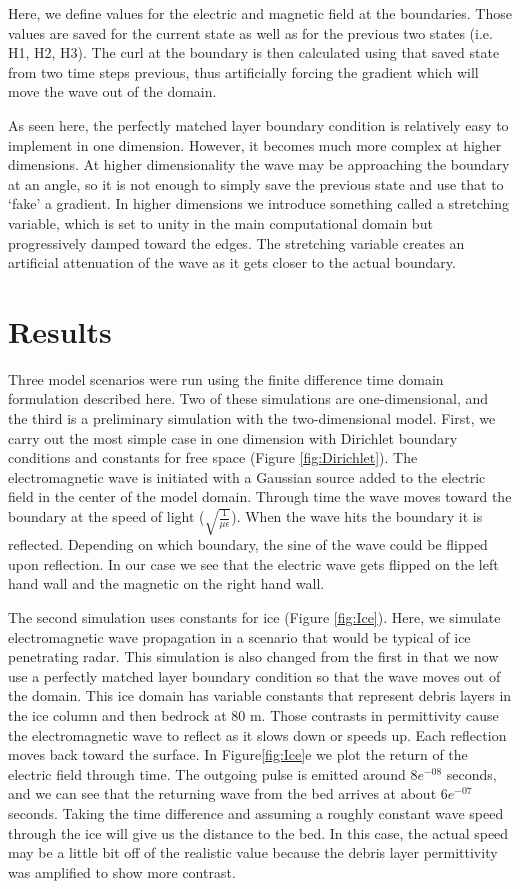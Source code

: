 \documentclass[a4paper]{article}
\begin{document}
Here, we define values for the electric and magnetic field at the boundaries. Those values are saved for the current state as well as for the previous two states (i.e. H1, H2, H3). The curl at the boundary is then calculated using that saved state from two time steps previous, thus artificially forcing the gradient which will move the wave out of the domain. 

As seen here, the perfectly matched layer boundary condition is relatively easy to implement in one dimension. However, it becomes much more complex at higher dimensions. At higher dimensionality the wave may be approaching the boundary at an angle, so it is not enough to simply save the previous state and use that to `fake' a gradient. In higher dimensions we introduce something called a stretching variable, which is set to unity in the main computational domain but progressively damped toward
the edges. The stretching variable creates an artificial attenuation of the wave as it gets closer to the actual boundary.  

\section{Results}

Three model scenarios were run using the finite difference time domain formulation described here. Two of these simulations are one-dimensional, and the third is a preliminary simulation with the two-dimensional model. First, we carry out the most simple case in one dimension with Dirichlet boundary conditions and constants for free space (Figure \ref{fig:Dirichlet}). The electromagnetic wave is initiated with a Gaussian source added to the electric field in the center of the model domain.
Through time the wave moves toward the boundary at the speed of light ($\sqrt{\frac{1}{\mu \epsilon}}$). When the wave hits the boundary it is reflected. Depending on which boundary, the sine of the wave could be flipped upon reflection. In our case we see that the electric wave gets flipped on the left hand wall and the magnetic on the right hand wall. 

The second simulation uses constants for ice (Figure \ref{fig:Ice}). Here, we simulate electromagnetic wave propagation in a scenario that would be typical of ice penetrating radar. This simulation is also changed from the first in that we now use a perfectly matched layer boundary condition so that the wave moves out of the domain. This ice domain has variable constants that represent debris layers in the ice column and then bedrock at 80 m. Those contrasts in permittivity cause the
electromagnetic wave to reflect as it slows down or speeds up. Each reflection moves back toward the surface. In Figure\ref{fig:Ice}e we plot the return of the electric field through time. The outgoing pulse is emitted around $8e^{-08}$ seconds, and we can see that the returning wave from the bed arrives at about $6e^{-07}$ seconds. Taking the time difference and assuming a roughly constant wave speed through the ice will give us the distance to the bed. In this case, the actual speed may be a little bit off of the realistic value because the debris layer permittivity was amplified to show more contrast. 
\end{document}
